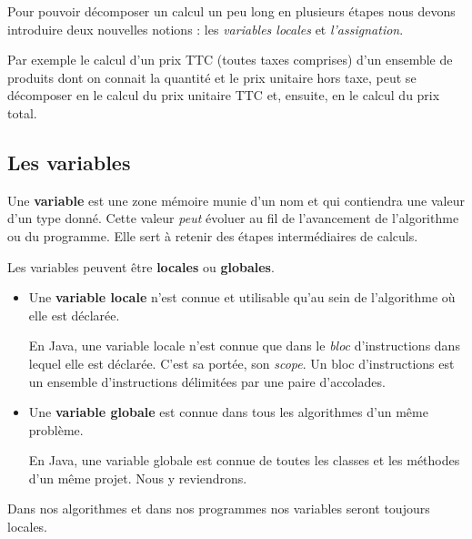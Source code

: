 		Pour pouvoir décomposer un calcul un peu long en plusieurs étapes
		nous devons introduire deux nouvelles notions :
		les \emph{variables locales} et \emph{l’assignation}.

		Par exemple le calcul d'un prix TTC (toutes taxes comprises) d'un
		ensemble de produits dont on connait la quantité et le prix unitaire
		hors taxe, peut se décomposer en le calcul du prix unitaire TTC et,
		ensuite, en le calcul du prix total. 

		\subsection{Les variables}
	
			Une \textbf{variable} est une zone mémoire munie
			d'un nom et qui contiendra une valeur d’un type donné.  Cette valeur
			\emph{peut} évoluer au fil de l'avancement de l'algorithme ou du
			programme.  Elle sert à retenir des étapes intermédiaires de
			calculs.

			Les variables peuvent être \textbf{locales} ou \textbf{globales}.

			\begin{itemize}
				
				\item Une \textbf{variable locale} n'est
					connue et utilisable qu'au sein de l'algorithme où elle est
					déclarée. 
					
					En Java, une variable locale n'est connue que dans le
					\emph{bloc} d'instructions dans lequel elle est déclarée.
					C'est sa portée, son \textit{scope}.
					Un bloc d'instructions  est un ensemble
					d'instructions délimitées par une paire d'accolades. 

				\item Une \textbf{variable globale} est 
					connue dans tous les algorithmes d'un même problème. 

					En Java, une variable globale est connue de toutes les
					classes et les méthodes d'un même projet. Nous y reviendrons. 

			\end{itemize}
				
			Dans nos algorithmes et dans nos programmes nos variables  seront
			toujours locales. 


